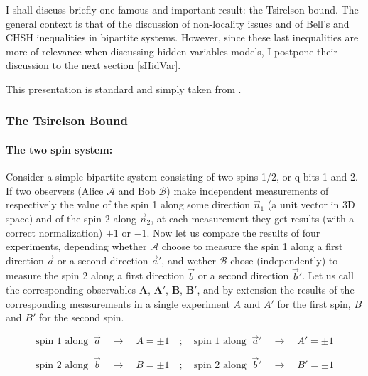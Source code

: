 I shall discuss briefly one famous and important result: the  Tsirelson bound.
The general context is that of the discussion of non-locality issues and of Bell's \cite{Bell:1964kc} and CHSH inequalities \cite{PhysRevLett.23.880} in bipartite systems. 
However, since these last inequalities are more of relevance when discussing hidden variables models, I postpone their discussion to
the next section \ref{sHidVar}.

This presentation is standard and simply taken from \cite{Laloe-book}.



\subsubsection{The Tsirelson Bound}
\label{ssTsiBn}

\paragraph{The two spin system:} Consider a simple bipartite system consisting of two spins 1/2, or q-bits 1 and 2.
If two observers (Alice $\mathcal{A}$ and Bob $\mathcal{B}$) make independent measurements of respectively the value of the spin 1 along some direction $\vec n_1$ (a unit vector in 3D space)
and of the spin 2 along $\vec n_2$, at each measurement they get results (with a correct normalization) $+1$ or $-1$.
Now let us compare the results of four experiments, depending whether $\mathcal{A}$ choose to measure the spin 1 along a first direction $\vec a$ or a second direction $\vec a'$, and wether $\mathcal{B}$ chose (independently) to measure the spin 2 along a first direction $\vec b$ or a second direction $\vec b'$. Let us call the corresponding observables $\mathbf{A}$, $\mathbf{A'}$, $\mathbf{B}$, $\mathbf{B'}$, and by extension the results of the corresponding measurements in a single experiment $A$ and $A'$ for the first  spin, $B$ and $B'$ for the second spin.

\begin{equation}
\label{ }
\text{spin 1 along }\ \vec a \quad \to\quad A= \pm 1
\quad;\quad
\text{spin 1 along }\ \vec a' \quad \to\quad A'= \pm 1
\end{equation}

\begin{equation}
\label{ }
\text{spin 2 along }\ \vec b \quad \to\quad B= \pm 1
\quad;\quad
\text{spin 2 along }\ \vec b' \quad \to\quad B'= \pm 1
\end{equation}

